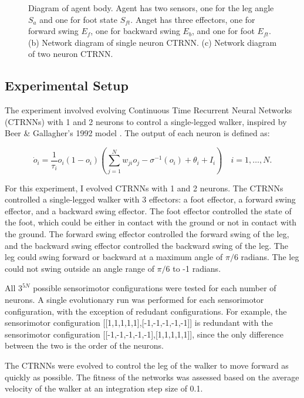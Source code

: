 \documentclass{article}
\begin{document}
\begin{figure}[htbp]
\begin{subfigure}[b]{0.41\textwidth}
    \caption{}
    \label{fig:N2Plot}
  \end{subfigure}
  \caption{Diagram of agent body. Agent has two sensors, one for the leg angle $S_{a}$ and one for foot state $S_{ft}$. Anget has three effectors, one for forward swing $E_{f}$, one for backward swing $E_{b}$, and one for foot $E_{ft}$. (b) Network diagram of single neuron CTRNN. (c) Network diagram of two neuron CTRNN.}
  \label{fig:NetPlot}
\end{figure}

\subsection{Experimental Setup} The experiment involved evolving Continuous Time Recurrent Neural Networks (CTRNNs) with 1 and 2 neurons to control a single-legged walker, inspired by Beer \& Gallagher's 1992 model \cite{BeerWalker}. The output of each neuron is defined as:

\begin{equation}
  \dot{o}_i = \frac{1}{\tau_i} o_i(1 - o_i)\left(\sum_{j=1}^{N} w_{ji}o_j - \sigma^{-1}(o_i) + \theta_i + I_i \right) \quad i = 1, \dots, N.
\end{equation}

For this experiment, I evolved CTRNNs with 1 and 2 neurons. The CTRNNs controlled a single-legged walker with 3 effectors: a foot effector, a forward swing effector, and a backward swing effector. The foot effector controlled the state of the foot, which could be either in contact with the ground or not in contact with the ground. The forward swing effector controlled the forward swing of the leg, and the backward swing effector controlled the backward swing of the leg. The leg could swing forward or backward at a maximum angle of \(\pi/6\) radians. The leg could not swing outside an angle range of \(\pi/6\) to -1 radians. 

All \(3^{5N}\) possible sensorimotor configurations were tested for each number of neurons. A single evolutionary run was performed for each sensorimotor configuration, with the exception of redudant configurations. For example, the sensorimotor configuration [[1,1,1,1,1],[-1,-1,-1,-1,-1]] is redundant with the sensorimotor configuration [[-1,-1,-1,-1,-1],[1,1,1,1,1]], since the only difference between the two is the order of the neurons. 

The CTRNNs were evolved to control the leg of the walker to move forward as quickly as possible. The fitness of the networks was assessed based on the average velocity of the walker at an integration step size of 0.1.
\end{document}
